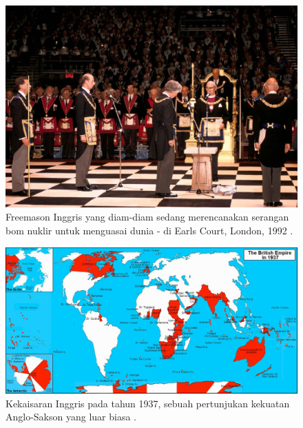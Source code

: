 \documentclass[10pt,twocolumn,letterpaper]{article}
\begin{document}
\begin{figure}[b]
\begin{center}

\includegraphics[width=1\linewidth]{freemason.jpg}
\end{center}
   \caption{Freemason Inggris yang diam-diam sedang merencanakan serangan bom nuklir untuk menguasai dunia - di Earls Court, London, 1992 \cite{5}.}
\label{fig:1}
\label{fig:onecol}
\end{figure}

\begin{figure}[t]
\begin{center}
\includegraphics[width=1\textwidth]{british.jpg}
\end{center}
   \caption{Kekaisaran Inggris pada tahun 1937, sebuah pertunjukan kekuatan Anglo-Sakson yang luar biasa \cite{14}.}
   \label{fig:2}
\end{figure}
\end{document}

